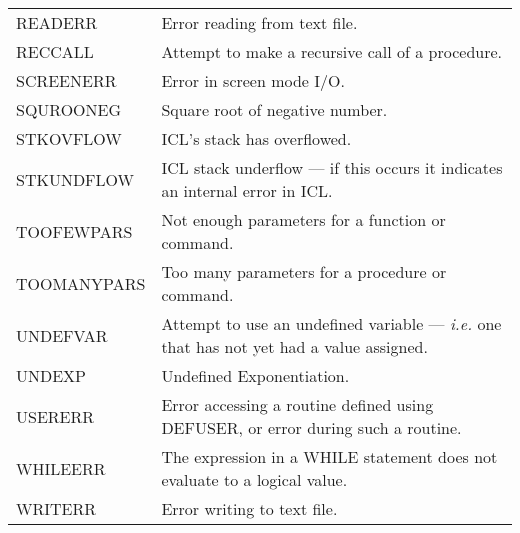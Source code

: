 \begin{center}
\begin{tabular}{ll}
READERR &  Error reading from text file. \\
RECCALL  &  Attempt to make a recursive call of a procedure. \\
SCREENERR  &  Error in screen mode I/O. \\
SQUROONEG  &  Square root of negative number. \\
STKOVFLOW  &  ICL's stack has overflowed. \\
STKUNDFLOW  &  ICL stack underflow --- if this occurs it indicates an internal
   error in ICL. \\
TOOFEWPARS  &  Not enough parameters for a function or command. \\
TOOMANYPARS  &  Too many parameters for a procedure or command. \\
UNDEFVAR  &  Attempt to use an undefined variable --- {\em i.e.} one that has
   not yet had a value assigned.  \\
UNDEXP  &  Undefined Exponentiation.  \\
USERERR  &  Error accessing a routine defined using DEFUSER, or error during
   such a routine. \\
WHILEERR & The expression in a WHILE statement does not evaluate to a logical
   value. \\
WRITERR  &  Error writing to text file.
\end{tabular}
\end{center}

